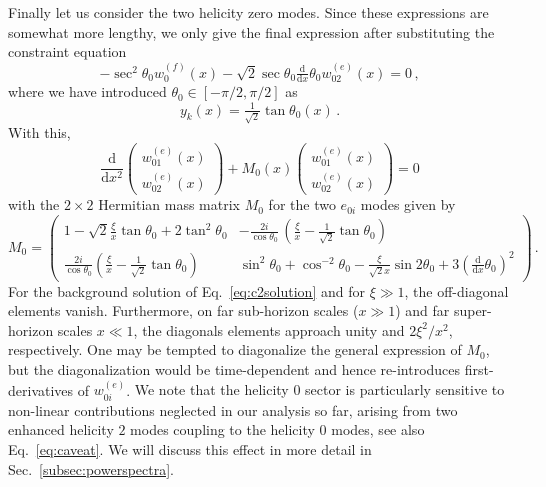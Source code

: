 Finally let us consider the two helicity zero modes. Since these expressions are somewhat more lengthy, we only give the final expression after substituting the constraint equation
\begin{equation}
 -  \sec^2 \theta_0  w^{(f)}_{0}(x)- \sqrt{2}  \sec \theta_0  \tfrac{\textrm{d}}{\textrm{d}x}\theta_{0} w^{(e)}_{02}(x)  = 0\label{eq:0constraint} \,,
\end{equation}
where we have introduced $\theta_0 \in [- \pi/2, \pi/2]$ as
\begin{equation}
 y_k(x)=\tfrac{1}{\sqrt{2}}\tan\theta_{0}(x) \,.
\end{equation}
With this,
\begin{equation}
 \frac{\textrm{d} }{\textrm{d}x^2}\left(\begin{array}{c}
  w^{(e)}_{01}(x)\\
 w^{(e)}_{02}(x)
\end{array}\right)+M_{0}(x)\left(\begin{array}{c}
w^{(e)}_{01}(x)\\
w^{(e)}_{02}(x)
\end{array}\right)  = 0
\label{eq:0modes}
\end{equation}
with the $2\times2$ Hermitian mass matrix $M_{0}$ for the two $e_{0i}$ modes given by
\[
M_{0}=\left(\begin{array}{cc}
1-\sqrt{2}\frac{\xi}{x}\tan\theta_{0}+2\tan^{2}\theta_{0} & -\frac{2i}{\cos\theta_0}\,\left(\frac{\xi}{x}-\tfrac{1}{\sqrt{2}}\tan\theta_{0}\right)\\
\frac{2i}{\cos\theta_0}\left(\frac{\xi}{x}-\tfrac{1}{\sqrt{2}}\tan\theta_{0}\right) & \sin^{2}\theta_{0}+\cos^{-2}\theta_{0}-\frac{\xi}{\sqrt{2}x}\sin2\theta_{0}+3\left(\tfrac{\textrm{d}}{\textrm{d}x}\theta_{0}\right)^{2}
\end{array}\right)\,.
\label{eq:M0}
\]
{For the background solution of Eq.~\eqref{eq:c2solution} and for $\xi \gg 1$, the off-diagonal elements vanish. Furthermore, on far sub-horizon scales ($x \gg 1$) and far super-horizon scales  $x \ll 1$, the diagonals elements approach unity and $2 \xi^2/x^2$, respectively.}
One may be tempted to diagonalize the general expression of $M_{0}$, but the diagonalization
would be time-dependent and hence re-introduces first-derivatives of $w^{(e)}_{0i}$. {We note that the helicity 0 sector is particularly sensitive to non-linear contributions neglected in our analysis so far, arising from two enhanced helicity $2$ modes coupling to the helicity 0 modes, see also Eq.~\eqref{eq:caveat}. We will discuss this effect in more detail in Sec.~\ref{subsec:powerspectra}.}


